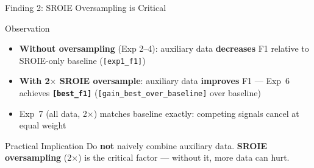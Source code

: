 \documentclass[aspectratio=169,11pt]{beamer}
\newcommand{\VAR}[1]{\texttt{[#1]}\xspace}
\newcommand{\hlnum}[1]{\textcolor{AccentTeal}{\textbf{#1}}}
\newcommand{\redbf}[1]{\textcolor{WarnRed}{\textbf{#1}}}
\newcommand{\greenbf}[1]{\textcolor{GoodGreen}{\textbf{#1}}}
\begin{document}
\begin{frame}{Finding 2: SROIE Oversampling is Critical}
  \begin{block}{Observation}
    \begin{itemize}
      \item \textbf{Without oversampling} (Exp 2--4): auxiliary data
            \redbf{decreases} F1 relative to SROIE-only baseline (\VAR{exp1_f1})
      \item \textbf{With 2$\times$ SROIE oversample}: auxiliary data
            \greenbf{improves} F1 --- Exp~6 achieves \hlnum{\VAR{best_f1}}
            (\VAR{gain_best_over_baseline} over baseline)
      \item Exp~7 (all data, 2$\times$) matches baseline exactly:
            competing signals cancel at equal weight
    \end{itemize}
  \end{block}

  \vspace{0.3cm}

  \begin{exampleblock}{Practical Implication}
    Do \textbf{not} naively combine auxiliary data.
    \textbf{SROIE oversampling} (2$\times$) is the critical factor ---
    without it, more data can hurt.
  \end{exampleblock}
\end{frame}
\end{document}
